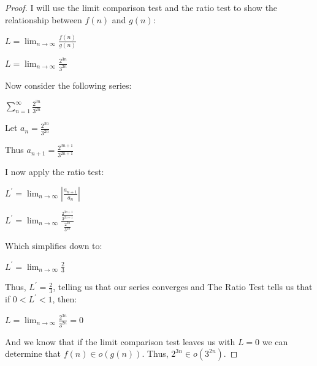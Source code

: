 \documentclass[11pt]{article}
\theoremstyle{definition}
\theoremstyle{definition}
\theoremstyle{definition}
\begin{document}
\begin{proof}
I will use the limit comparison test and the ratio test to show the relationship between $f(n)$ and $g(n)$:

$L = \lim_{n \to \infty} \frac{f(n)}{g(n)}$

$L = \lim_{n \to \infty} \frac{2^{3n}}{3^{2n}}$

Now consider the following series:

$\sum_{n=1}^{\infty} \frac{2^{3n}}{3^{2n}}$

Let $a_n =  \frac{2^{3n}}{3^{2n}}$

Thus $a_{n+1} =  \frac{2^{3n+1}}{3^{2n+1}}$

I now apply the ratio test:


$L^{'} = \lim_{n \to \infty} |\frac{a_{n+1}}{a_{n}}|$


$L^{'} =\lim_{n\to\infty} \frac{\frac{2^{3n+1}}{3^{2n+1}}}{\frac{2^{3n}}{3^{2n}}}$

Which simplifies down to:

$L^{'} = \lim_{n\to\infty} \frac{2}{3}$

Thus, $L^{'} = \frac{2}{3}$, telling us that our series converges and The Ratio Test tells us that if $0 < L^{'} < 1$, then:

$L = \lim_{n \to \infty} \frac{2^{3n}}{3^{2n}} = 0$

And we know that if the limit comparison test leaves us with $L=0$ we can determine that $f(n)\in o(g(n))$. Thus, $2^{3n} \in o(3^{2n})$.

\end{proof}




\end{document}
